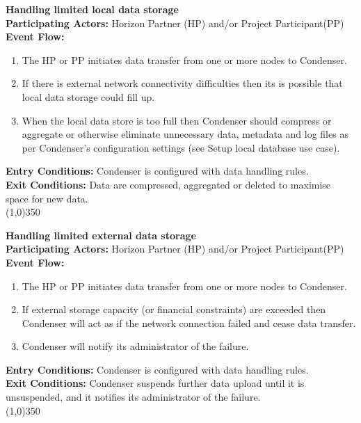 		\textbf{Handling limited local data storage} \\
		\textbf{Participating Actors:} Horizon Partner (HP) and/or Project Participant(PP) \\
		\textbf{Event Flow:}
		\begin{enumerate}
\item The HP or PP initiates data transfer from one or more nodes to Condenser.
\item If there is external network connectivity difficulties then its is possible that local data storage could fill up.
\item When the local data store is too full then Condenser should compress or aggregate or otherwise eliminate unnecessary data, metadata and log files as per Condenser's configuration settings (see Setup local database use case).
	    \end{enumerate}
		\textbf{Entry Conditions:} Condenser is configured with data handling rules.\\
		\textbf{Exit Conditions:} Data are compressed, aggregated or deleted to maximise space for new data.\\
		\line(1,0){350}	
		
		\textbf{Handling limited external data storage} \\
		\textbf{Participating Actors:} Horizon Partner (HP) and/or Project Participant(PP) \\
		\textbf{Event Flow:}
		\begin{enumerate}
\item The HP or PP initiates data transfer from one or more nodes to Condenser.
\item If external storage capacity (or financial constraints) are exceeded then Condenser will act as if the network connection failed and cease data transfer.
\item Condenser will notify its administrator of the failure.
	    \end{enumerate}
		\textbf{Entry Conditions:} Condenser is configured with data handling rules.\\
		\textbf{Exit Conditions:} Condenser suspends further data upload until it is unsuspended, and it notifies its administrator of the failure.\\
		\line(1,0){350}			